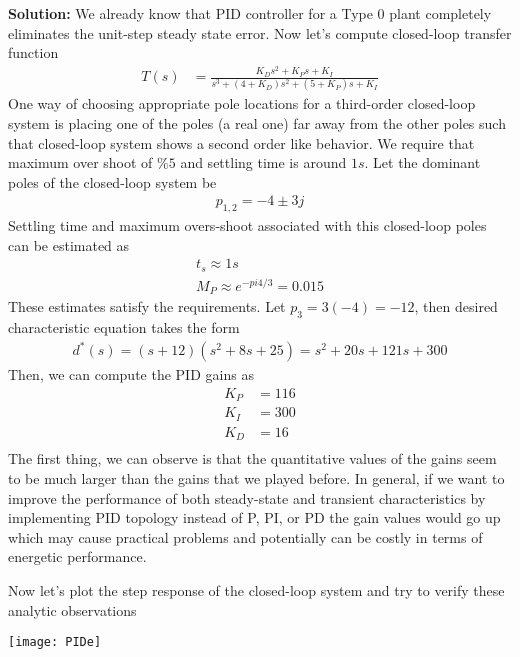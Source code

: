 \documentclass[twoside]{article}
\begin{document}
\textbf{Solution:} We already know that PID controller for a Type 0
plant completely eliminates the unit-step steady state error. Now 
let's compute closed-loop transfer function
%
\begin{align*}
  T(s) &= \frac{K_D s^2 +  K_P s +  K_I}{ s^3 + (4 + K_D) s^2 + (5 +K_P) s +  K_I}
\end{align*}
%
One way of choosing appropriate pole locations for a third-order
closed-loop system is placing one of the poles (a real one) far away from the
other poles such that closed-loop system shows a second order
like behavior. We require that maximum over shoot of $\% 5$
and settling time is around $1 s$. Let the dominant poles of the
closed-loop system be
%
\begin{align*}
  p_{1,2} = -4 \pm 3 j
\end{align*}
%
Settling time and maximum overs-shoot associated with this
closed-loop poles can be estimated as
%
\begin{align*}
 t_s \approx 1 s
\\
M_P \approx e^{-pi 4/3} = 0.015 
\end{align*}
%
These estimates satisfy the requirements. Let $p_3 = 3 (-4) = -12$, then
desired characteristic equation takes the form
%
\begin{align*}
d^*(s) = (s + 12)(s^2 + 8 s + 25) = s^2 + 20 s + 121 s + 300
\end{align*}
% 
Then, we can compute the PID gains as
%
\begin{align*}
  K_P &=  116 \\
  K_I &= 300 \\
  K_D &= 16\\
\end{align*}
%
The first thing, we can observe is that the quantitative values of the gains 
seem to be much larger than the gains that we played before.
In general, if we want to improve the performance of both
steady-state and transient characteristics by implementing PID 
topology instead of P, PI, or PD the gain values would go up
which may cause practical problems and potentially
can be costly in terms of energetic performance. 

Now let's plot the step response of the closed-loop
system and try to verify these analytic observations

\vspace{12 pt}

  \begin{minipage}[h]{1\linewidth}
    \begin{center}
      \texttt{[image: PIDe]}
    \end{center}
  \end{minipage}
\end{document}
